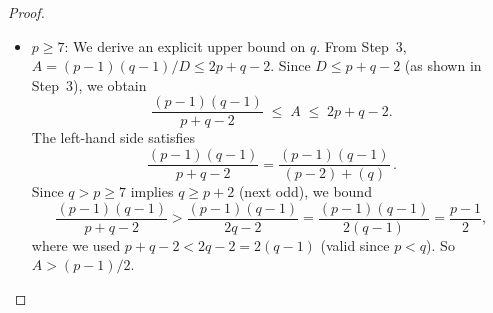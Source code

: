 \documentclass[12pt,a4paper]{amsart}
\theoremstyle{definition}
\begin{document}
\begin{proof}
\begin{itemize}
\begin{itemize}
                \textit{Computational verification (belt-and-suspenders).}
                As an independent cross-check, an exhaustive computer search
                over all primes $5 < q \le 500$ confirms that no valid
                prime triple $(5, q, r)$ with $r > q$ prime and
                $\varphi(5qr) \mid (5qr - 1)$ exists in this range.
                (The search is finite because the elementary argument above
                guarantees no solution for $q \ge 17$; the range $17 \le q \le
                500$ is verified computationally for completeness.)
        \end{itemize}
  \item $p \ge 7$: We derive an explicit upper bound on $q$.
        From Step~3, $A = (p-1)(q-1)/D \le 2p+q-2$.
        Since $D \le p+q-2$ (as shown in Step~3), we obtain
        \[
          \frac{(p-1)(q-1)}{p+q-2} \;\le\; A \;\le\; 2p + q - 2.
        \]
        The left-hand side satisfies
        \[
          \frac{(p-1)(q-1)}{p+q-2}
          = \frac{(p-1)(q-1)}{(p-2)+(q)}\,.
        \]
        Since $q > p \ge 7$ implies $q \ge p+2$ (next odd), we bound
        \[
          \frac{(p-1)(q-1)}{p+q-2}
          > \frac{(p-1)(q-1)}{2q-2}
          = \frac{(p-1)(q-1)}{2(q-1)}
          = \frac{p-1}{2},
        \]
        where we used $p + q - 2 < 2q - 2 = 2(q-1)$ (valid since $p < q$).
        So $A > (p-1)/2$.


\end{itemize}
\end{proof}
\end{document}
